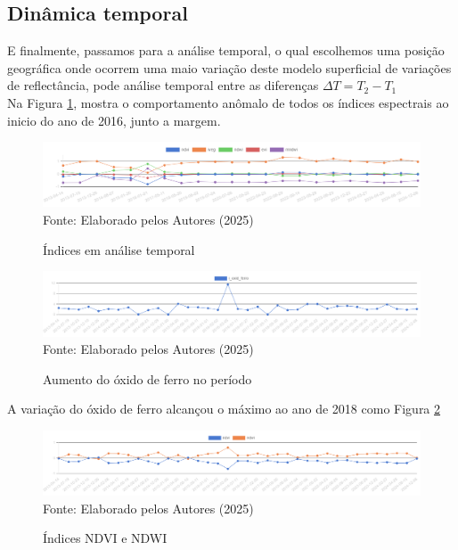  
 
\subsection{Dinâmica temporal }
\hspace*{1.25 cm} E finalmente, passamos para a análise temporal, o qual escolhemos uma posição geográfica onde ocorrem uma maio variação deste modelo superficial de variações de reflectância, pode análise temporal entre as diferenças  \( \Delta T = T_{2}  - T_{1} \)\\
%
\hspace*{1.25 cm}  Na Figura \ref{fig:INDICES}, mostra o comportamento anômalo de todos os índices espectrais ao inicio do ano de 2016, junto a margem.\\

 \begin{figure}[H]
	\centering  \small \caption{Índices em  análise temporal}
	\includegraphics[width=0.97\linewidth]{FIGURAS/indices}
	\label{fig:INDICES}{ Fonte:   Elaborado pelos Autores (2025)}
\end{figure}

 \begin{figure}[H]
	\centering  \small \caption{Aumento do óxido de ferro no período}
	\includegraphics[width=0.97\linewidth]{FIGURAS/graphvisualiser-1747928533564}
	\label{fig:INDICES2}{ Fonte:   Elaborado pelos Autores (2025)}
\end{figure}

\hspace*{1.25 cm} A variação do óxido de ferro alcançou o máximo ao ano de 2018 como Figura \ref{fig:INDICES2}\\
%
\begin{figure}[H]
	\centering  \small \caption{Índices NDVI e NDWI}
	\includegraphics[width=0.97\linewidth]{FIGURAS/graphvisualiser-1747928457345}
	\label{fig:INDICES3}{ Fonte:   Elaborado pelos Autores (2025)}
\end{figure}


